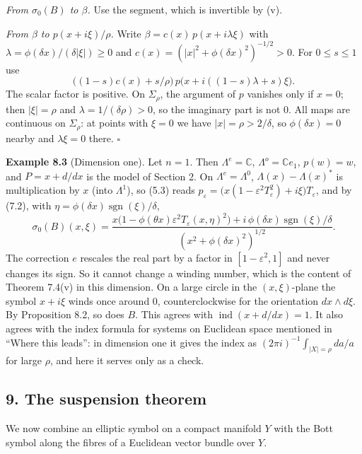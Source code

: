 \documentclass[
  11pt,
]{article}
\begin{document}
\emph{From \(\sigma_0(B)\) to \(\beta\).} Use the segment, which is
invertible by (v).

\emph{From \(\beta\) to \(p(x+i\xi)/\rho\).} Write
\(\beta=c(x)\,p(x+i\lambda\xi)\) with
\(\lambda=\phi(\delta x)/(\delta|\xi|)\ge0\) and
\(c(x)=(|x|^2+\phi(\delta x)^2)^{-1/2}>0\). For \(0\le s\le1\) use \[
\bigl((1-s)c(x)+s/\rho\bigr)\,p\bigl(x+i((1-s)\lambda+s)\xi\bigr).
\] The scalar factor is positive. On \(\Sigma_\rho\), the argument of
\(p\) vanishes only if \(x=0\); then \(|\xi|=\rho\) and
\(\lambda=1/(\delta\rho)>0\), so the imaginary part is not \(0\). All
maps are continuous on \(\Sigma_\rho\): at points with \(\xi=0\) we have
\(|x|=\rho>2/\delta\), so \(\phi(\delta x)=0\) nearby and
\(\lambda\xi=0\) there. \(\square\)

\textbf{Example 8.3} (Dimension one). Let \(n=1\). Then
\(\Lambda^e=\mathbb C\), \(\Lambda^o=\mathbb Ce_1\), \(p(w)=w\), and
\(P=x+d/dx\) is the model of Section 2. On \(\Lambda^e=\Lambda^0\),
\(\Lambda(x)-\Lambda(x)^*\) is multiplication by \(x\) (into
\(\Lambda^1\)), so (5.3) reads
\(p_\varepsilon=\bigl(x(1-\varepsilon^2T_\varepsilon^2)+i\xi\bigr)T_\varepsilon\),
and by (7.2), with
\(\eta=\phi(\delta x)\operatorname{sgn}(\xi)/\delta\), \[
\sigma_0(B)(x,\xi)=\frac{x\bigl(1-\phi(\theta x)\varepsilon^2T_\varepsilon(x,\eta)^2\bigr)+i\,\phi(\delta x)\operatorname{sgn}(\xi)/\delta}{(x^2+\phi(\delta x)^2)^{1/2}} .
\] The correction \(e\) rescales the real part by a factor in
\([1-\varepsilon^2,1]\) and never changes its sign. So it cannot change
a winding number, which is the content of Theorem 7.4(v) in this
dimension. On a large circle in the \((x,\xi)\)-plane the symbol
\(x+i\xi\) winds once around \(0\), counterclockwise for the orientation
\(dx\wedge d\xi\). By Proposition 8.2, so does \(B\). This agrees with
\(\operatorname{ind}(x+d/dx)=1\). It also agrees with the index formula
for systems on Euclidean space mentioned in ``Where this leads'': in
dimension one it gives the index as \((2\pi i)^{-1}\int_{|X|=\rho}da/a\)
for large \(\rho\), and here it serves only as a check.

\subsection{9. The suspension theorem}\label{the-suspension-theorem}

We now combine an elliptic symbol on a compact manifold \(Y\) with the
Bott symbol along the fibres of a Euclidean vector bundle over \(Y\).
\end{document}
